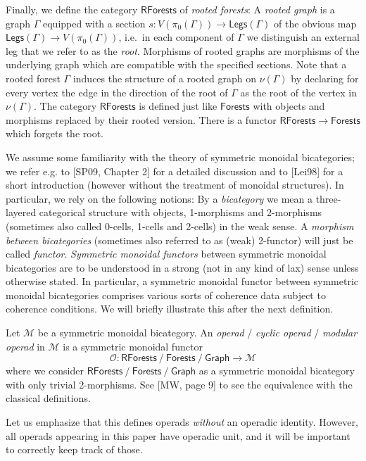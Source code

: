 \documentclass[11pt]{article}
\theoremstyle{definition}
\begin{document}
Finally, we define the category $\mathsf{RForests}$ of \emph{rooted forests}: A \emph{rooted graph} is a graph $\Gamma$ equipped with a section $s : V(\pi_0(\Gamma)) \to \mathsf{Legs}(\Gamma)$ of the obvious map $\mathsf{Legs}(\Gamma) \to V(\pi_0(\Gamma))$, i.e.\ in each component of $\Gamma$ we distinguish an external leg that we refer to as the \emph{root}. Morphisms of rooted graphs are morphisms of the underlying graph which are compatible with the specified sections. Note that a rooted forest $\Gamma$ induces the structure of a rooted graph on $\nu(\Gamma)$ by declaring for every vertex the edge in the direction of the root of $\Gamma$ as the root of the vertex in $\nu(\Gamma)$. The category $\mathsf{RForests}$ is defined just like $\mathsf{Forests}$ with objects and morphisms replaced by their rooted version. There is a functor $\mathsf{RForests} \to \mathsf{Forests}$ which forgets the root.



We assume some familiarity with the theory of symmetric monoidal bicategories; we refer e.g. to [SP09, Chapter 2] for a detailed discussion and to [Lei98] for a short introduction (however without the treatment of monoidal structures). In particular, we rely on the following notions: By a \emph{bicategory} we mean a three-layered categorical structure with objects, 1-morphisms and 2-morphisms (sometimes also called 0-cells, 1-cells and 2-cells) in the weak sense. A \emph{morphism between bicategories} (sometimes also referred to as (weak) 2-functor) will just be called \emph{functor}. \emph{Symmetric monoidal functors} between symmetric monoidal bicategories are to be understood in a strong (not in any kind of lax) sense unless otherwise stated. In particular, a symmetric monoidal functor between symmetric monoidal bicategories comprises various sorts of coherence data subject to coherence conditions. We will briefly illustrate this after the next definition.


Let $\mathcal{M}$ be a symmetric monoidal bicategory. An \emph{operad} / \emph{cyclic operad} / \emph{modular operad}  in $\mathcal{M}$ is a symmetric monoidal functor $$\mathcal{O} : \mathsf{RForests} \ / \ \mathsf{Forests}  \ / \ \mathsf{Graph} \to \mathcal{M}$$ where we consider $\mathsf{RForests} \ / \ \mathsf{Forests}  \ / \ \mathsf{Graph}$ as a symmetric monoidal bicategory with only trivial 2-morphisms. See [MW, page 9] to see the equivalence with the classical definitions.

Let us emphasize that this defines operads \emph{without} an operadic identity. However, all operads appearing in this paper have operadic unit, and it will be important to correctly keep track of those. 
\end{document}
